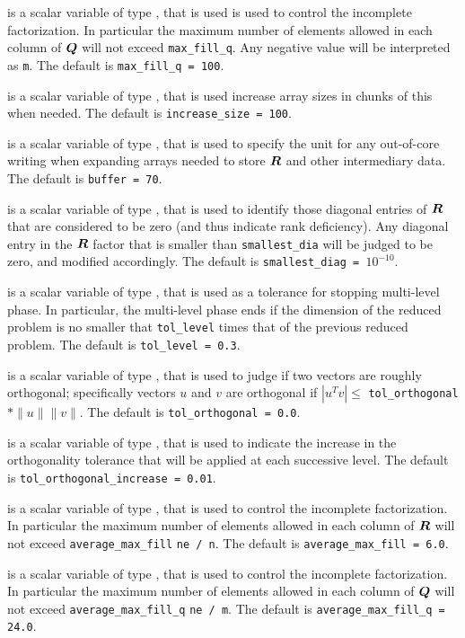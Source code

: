 \documentclass{galahad}
\begin{document}
\begin{description}
 is a scalar variable of type \integer, that is used
is used to control the incomplete factorization. In particular
the maximum number of elements allowed in each column of ${\bm{Q}}$ will not exceed
{\tt max\_fill\_q}.
Any negative value will be interpreted as {\tt m}.
The default is {\tt max\_fill\_q = 100}.

  is a scalar variable of type \integer, that is 
used increase array sizes in chunks of this when needed.
The default is {\tt increase\_size = 100}.

 is a scalar variable of type \integer, that is used
to specify the unit for any out-of-core writing when expanding arrays
needed to store ${\bm{R}}$ and other intermediary data. 
The default is {\tt buffer = 70}.

 is a scalar variable of type \realdp, that is used
to identify those diagonal entries of ${\bm{R}}$ that are considered to be zero
(and thus indicate rank deficiency). Any diagonal entry in the ${\bm{R}}$
factor that is smaller than {\tt smallest\_dia} will be judged to be zero, 
and modified accordingly.
The default is {\tt smallest\_diag = }$10^{-10}$.

 is a scalar variable of type \realdp, that is used
as a tolerance for stopping multi-level phase. In particular, the
multi-level phase ends if the dimension of the reduced problem 
is no smaller that {\tt tol\_level} times that of the previous
reduced problem.
The default is {\tt tol\_level = 0.3}.

 is a scalar variable of type \realdp, 
that is used to judge if two vectors are roughly orthogonal; specifically
vectors $u$ and $v$ are orthogonal if $|u^T v| \leq$ {\tt tol\_orthogonal} 
$\ast \|u\| \|v\|$.
The default is {\tt tol\_orthogonal = 0.0}.

 is a scalar variable of type \realdp, 
that is used to indicate the increase in the orthogonality tolerance 
that will be applied at each successive level.
The default is {\tt tol\_orthogonal\_increase = 0.01}.

 is a scalar variable of type \realdp, that 
is used to control the incomplete factorization. In particular
 the maximum number of elements allowed in each column of ${\bm{R}}$ will not exceed
{\tt average\_max\_fill} {\tt * ne / n}.
The default is {\tt average\_max\_fill = 6.0}.

 is a scalar variable of type \realdp, that 
is used to control the incomplete factorization. In particular
 the maximum number of elements allowed in each column of ${\bm{Q}}$ will not exceed
{\tt average\_max\_fill\_q} {\tt * ne / m}.
The default is {\tt average\_max\_fill\_q = 24.0}.


\end{description}
\end{document}
